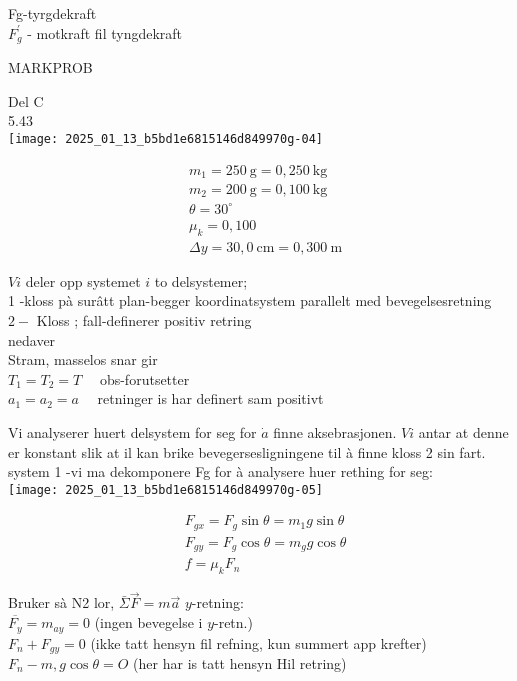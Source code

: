 \documentclass[10pt]{article}
\begin{document}
Fg-tyrgdekraft\\
$F_{g}^{\prime}$ - motkraft fil tyngdekraft

MARKPROB

Del C\\
5.43\\
\texttt{[image: 2025\_01\_13\_b5bd1e6815146d849970g-04]}

$$
\begin{aligned}
& m_{1}=250 \mathrm{~g}=0,250 \mathrm{~kg} \\
& m_{2}=200 \mathrm{~g}=0,100 \mathrm{~kg} \\
& \theta=30^{\circ} \\
& \mu_{k}=0,100 \\
& \Delta y=30,0 \mathrm{~cm}=0,300 \mathrm{~m}
\end{aligned}
$$

$V i$ deler opp systemet $i$ to delsystemer;\\
1 -kloss pà surâtt plan-begger koordinatsystem parallelt med bevegelsesretning\\
$2-$ Kloss ; fall-definerer positiv retring\\
nedaver\\
Stram, masselos snar gir\\
$T_{1}=T_{2}=T \quad$ obs-forutsetter\\
$a_{1}=a_{2}=a \quad$ retninger is har definert sam positivt

Vi analyserer huert delsystem for seg for $\dot{a}$ finne aksebrasjonen. $V i$ antar at denne er konstant slik at il kan brike bevegersesligningene til à finne kloss 2 sin fart.\\
system 1 -vi ma dekomponere Fg for à analysere huer rething for seg:\\
\texttt{[image: 2025\_01\_13\_b5bd1e6815146d849970g-05]}

$$
\begin{aligned}
& F_{g x}=F_{g} \sin \theta=m_{1} g \sin \theta \\
& F_{g y}=F_{g} \cos \theta=m_{g} g \cos \theta \\
& f=\mu_{k} F_{n}
\end{aligned}
$$

Bruker sà N2 lor, $\bar{\Sigma} \vec{F}=m \vec{a}$ $y$-retning:\\
$\overline{F_{y}}=m_{a y}=0$ (ingen bevegelse i $y$-retn.)\\
$F_{n}+F_{g y}=0$ (ikke tatt hensyn fil refning, kun summert app krefter)\\
$F_{n}-m, g \cos \theta=O$ (her har is tatt hensyn Hil retring)
\end{document}
